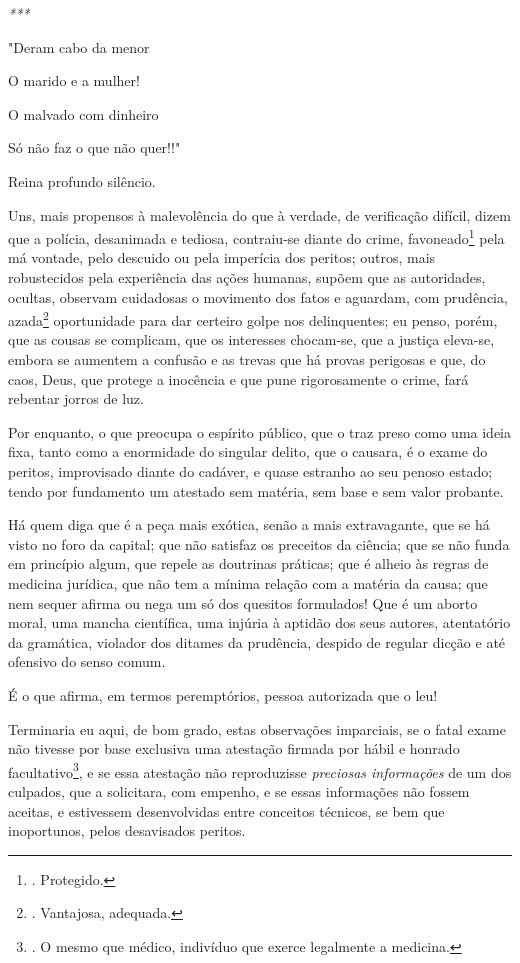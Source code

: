 \emph{***}

"Deram cabo da menor

O marido e a mulher!

O malvado com dinheiro

Só não faz o que não quer!!"

Reina profundo silêncio.

Uns, mais propensos à malevolência do que à verdade, de verificação
difícil, dizem que a polícia, desanimada e tediosa, contraiu-se diante
do crime, favoneado\footnote{. Protegido.} pela má vontade, pelo
descuido ou pela imperícia dos peritos; outros, mais robustecidos pela
experiência das ações humanas, supõem que as autoridades, ocultas,
observam cuidadosas o movimento dos fatos e aguardam, com prudência,
azada\footnote{. Vantajosa, adequada.} oportunidade para dar certeiro
golpe nos delinquentes; eu penso, porém, que as cousas se complicam, que
os interesses chocam-se, que a justiça eleva-se, embora se aumentem a
confusão e as trevas que há provas perigosas e que, do caos, Deus, que
protege a inocência e que pune rigorosamente o crime, fará rebentar
jorros de luz.

Por enquanto, o que preocupa o espírito público, que o traz preso como
uma ideia fixa, tanto como a enormidade do singular delito, que o
causara, é o exame do peritos, improvisado diante do cadáver, e quase
estranho ao seu penoso estado; tendo por fundamento um atestado sem
matéria, sem base e sem valor probante.

Há quem diga que é a peça mais exótica, senão a mais extravagante, que
se há visto no foro da capital; que não satisfaz os preceitos da
ciência; que se não funda em princípio algum, que repele as doutrinas
práticas; que é alheio às regras de medicina jurídica, que não tem a
mínima relação com a matéria da causa; que nem sequer afirma ou nega um
só dos quesitos formulados! Que é um aborto moral, uma mancha
científica, uma injúria à aptidão dos seus autores, atentatório da
gramática, violador dos ditames da prudência, despido de regular dicção
e até ofensivo do senso comum.

É o que afirma, em termos peremptórios, pessoa autorizada que o leu!

Terminaria eu aqui, de bom grado, estas observações imparciais, se o
fatal exame não tivesse por base exclusiva uma atestação firmada por
hábil e honrado facultativo\footnote{. O mesmo que médico, indivíduo que
  exerce legalmente a medicina.}, e se essa atestação não reproduzisse
\emph{preciosas informações} de um dos culpados, que a solicitara, com
empenho, e se essas informações não fossem aceitas, e estivessem
desenvolvidas entre conceitos técnicos, se bem que inoportunos, pelos
desavisados peritos.

